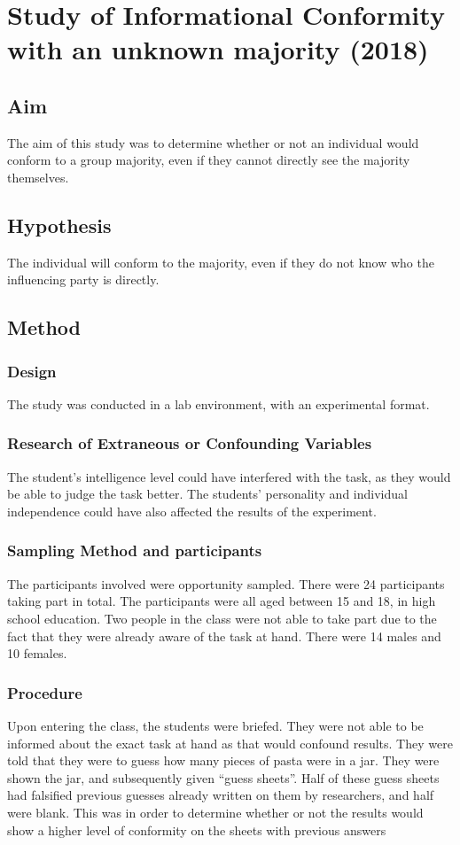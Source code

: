 \documentclass{report}
\begin{document}
\chapter{Study of Informational Conformity with an unknown majority (2018)}
\section {Aim}
The aim of this study was to determine whether or not an individual would conform to a group majority, even if they cannot directly see the majority themselves.
\section{Hypothesis}
The individual will conform to the majority, even if they do not know who the influencing party is directly.
\section {Method}
\subsection{Design}
The study was conducted in a lab environment, with an experimental format.
\subsection{Research of Extraneous or Confounding Variables}
The student’s intelligence level could have interfered with the task, as they would be able to judge the task better. The students’ personality and individual independence could have also affected the results of the experiment.
\subsection{Sampling Method and participants}
The participants involved were opportunity sampled. There were 24 participants taking part in total. The participants were all aged between 15 and 18, in high school education. Two people in the class were not able to take part due to the fact that they were already aware of the task at hand. There were 14 males and 10 females.
\subsection{Procedure}
Upon entering the class, the students were briefed. They were not able to be informed about the exact task at hand as that would confound results. They were told that they were to guess how many pieces of pasta were in a jar. They were shown the jar, and subsequently given “guess sheets”. Half of these guess sheets had falsified previous guesses already written on them by researchers, and half were blank. This was in order to determine whether or not the results would show a higher level of conformity on the sheets with previous answers
\begin{center}
\end{center}
\end{document}
